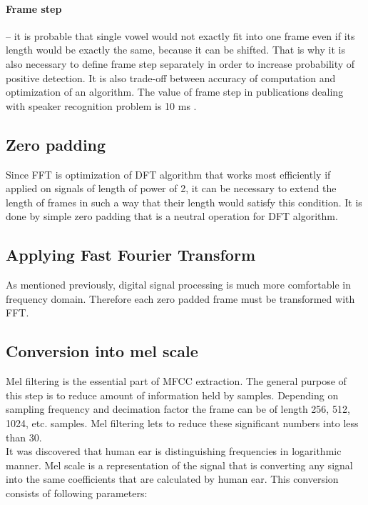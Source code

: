 \documentclass[magister]{dyplom}
\begin{document}
	\paragraph{Frame step} -- it is probable that single vowel would not exactly fit into one frame even if its length would be exactly the same, because it can be shifted. That is why it is also necessary to define frame step separately in order to increase probability of positive detection. It is also trade-off between accuracy of computation and optimization of an algorithm. The value of frame step in publications dealing with speaker recognition problem is 10 ms \cite{MFCC_description}. 
	
	\subsection{Zero padding}
	
	Since \gls{FFT} is optimization of \gls{DFT} algorithm that works most efficiently if applied on signals of length of power of 2, it can be necessary to extend the length of frames in such a way that their length would satisfy this condition. It is done by simple zero padding that is a neutral operation for \gls{DFT} algorithm.
	
	\subsection{Applying Fast Fourier Transform}	
	
	As mentioned previously, digital signal processing is much more comfortable in frequency domain. Therefore each zero padded frame must be transformed with \gls{FFT}.
	
	\subsection{Conversion into mel scale}
	
	Mel filtering is the essential part of \gls{MFCC} extraction. The general purpose of this step is to reduce amount of information held by samples. Depending on sampling frequency and decimation factor the frame can be of length 256, 512, 1024, etc. samples. Mel filtering lets to reduce these significant numbers into less than 30. \\
	
	It was discovered that human ear is distinguishing frequencies in logarithmic manner. Mel scale is a representation of the signal that is converting any signal into the same coefficients that are calculated by human ear. This conversion consists of following parameters:
	
\end{document}
